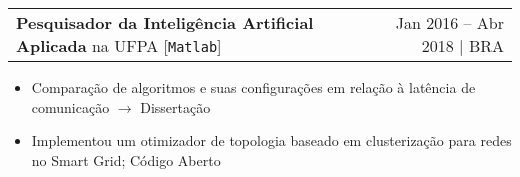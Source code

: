 \documentclass[a4paper,11pt]{article}
\makeatletter
\newcommand{\udensdot}[1]{%
    \tikz[baseline=(todotted.base)]{
        \node[inner sep=0.5pt,outer sep=0.5pt] (todotted) {#1};
        \draw[densely dotted] (todotted.south west) -- (todotted.south east);
    }%
}%
\newcommand{\myHref}[2]{\udensdot{\hspace{-1.2pt}\href{#1}{#2}\hspace{-4pt}}\hspace{-1.2pt}}
\newcommand{\myHrefIcn}[2]{#2 \href{#1}{\scriptsize{\faExternalLink{}}}}
\newcommand{\resumeItem}[2]{
  \item\small{
    \textbf{#1}{: #2 \vspace{-2pt}}
  }
}
\newcommand{\resumeItemCustom}[1]{
  \item\small{#1 \vspace{-2pt}}
}
\newcommand{\resumeJobSubheadingD}[7]{
  \vspace{0pt}\item
    \begin{tabular*}{0.97\textwidth}{l@{\extracolsep{\fill}}r}
      \textbf{#4} na \myHrefIcn{#1}{#2} \hspace{3pt} [\small \texttt{#6}] & {\small #5}
    \end{tabular*}\vspace{-6pt}
}
\newcommand{\resumeItemListStart}{\begin{itemize}}
\newcommand{\resumeItemListEnd}{\end{itemize}\vspace{-5pt}}
\makeatother
\begin{document}

    \resumeJobSubheadingD
      {http://www.lpo.ufpa.br/}{UFPA}%
      {Laboratório da faculdade da Engenharia Elétrica}%
      {Pesquisador da Inteligência Artificial Aplicada%
      }{Jan 2016 -- Abr 2018 $\vert$ BRA}
      {Matlab}%
      {Otimização de comunicação para Smart Grid por meio de posicionamento das células
      - Relacionado com o Mestrado}
      \resumeItemListStart
            \resumeItemCustom{Comparação de algoritmos e %
            suas configurações em relação à latência de comunicação $\rightarrow$ \myHrefIcn{http://www.repositorio.ufpa.br/jspui/bitstream/2011/10013/1/Dissertacao_ClusteringDrivenEquipament.pdf}{Dissertação}}
            \resumeItemCustom{Implementou um otimizador de topologia baseado em clusterização para redes no Smart Grid;
            \myHrefIcn{https://github.com/vrbsky/network-model}{Código Aberto}}
      \resumeItemListEnd
\end{document}
